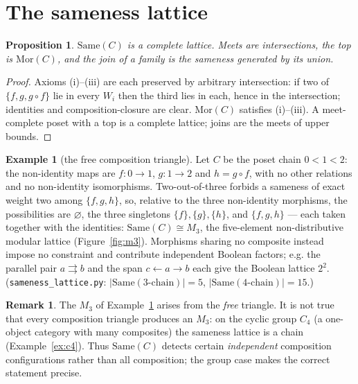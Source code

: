 \documentclass[11pt]{amsart}
\newtheorem{prop}[thm]{Proposition}
\theoremstyle{definition}
\newtheorem{rem}[thm]{Remark}
\newtheorem{ex}[thm]{Example}
\newcommand{\Same}{\mathrm{Same}}
\newcommand{\Mor}{\mathrm{Mor}}
\begin{document}
\section{The sameness lattice}\label{sec:lattice}

\begin{prop}\label{prop:lattice}
$\Same(C)$ is a complete lattice. Meets are intersections, the top is
$\Mor(C)$, and the join of a family is the sameness generated by its union.
\end{prop}

\begin{proof}
Axioms (i)--(iii) are each preserved by arbitrary intersection: if two of
$\{f,g,g\circ f\}$ lie in every $W_i$ then the third lies in each, hence in the
intersection; identities and composition-closure are clear. $\Mor(C)$ satisfies
(i)--(iii). A meet-complete poset with a top is a complete lattice; joins are
the meets of upper bounds.
\end{proof}

\begin{ex}[the free composition triangle]\label{ex:triangle}
Let $C$ be the poset chain $0<1<2$: the non-identity maps are $f\colon0\to1$,
$g\colon1\to2$ and $h=g\circ f$, with no other relations and no non-identity
isomorphisms. Two-out-of-three forbids a sameness of exact weight two among
$\{f,g,h\}$, so, relative to the three non-identity morphisms, the possibilities
are $\varnothing$, the three singletons $\{f\},\{g\},\{h\}$, and $\{f,g,h\}$ ---
each taken together with the identities: $\Same(C)\cong M_3$, the five-element
non-distributive modular lattice
(Figure~\ref{fig:m3}). Morphisms sharing no composite instead impose no
constraint and contribute independent Boolean factors; e.g. the parallel pair
$a\rightrightarrows b$ and the span $c\leftarrow a\rightarrow b$ each give the
Boolean lattice $2^{2}$. (\texttt{sameness\_lattice.py}: $|\Same(\text{3-chain})|
=5$, $|\Same(\text{4-chain})|=15$.)
\end{ex}

\begin{rem}\label{rem:nocompose}
The $M_3$ of Example~\ref{ex:triangle} arises from the \emph{free} triangle. It
is not true that every composition triangle produces an $M_3$: on the cyclic
group $C_4$ (a one-object category with many composites) the sameness lattice is
a chain (Example~\ref{ex:c4}). Thus $\Same(C)$ detects certain \emph{independent}
composition configurations rather than all composition; the group case makes the
correct statement precise.
\end{rem}
\end{document}
